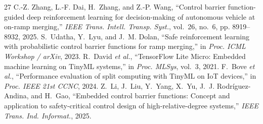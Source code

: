 \documentclass[journal]{IEEEtran}
\begin{document}
\begin{thebibliography}{27}
C.-Z. Zhang, L.-F. Dai, H.~Zhang, and Z.-P. Wang, ``Control barrier function-guided deep reinforcement learning for decision-making of autonomous vehicle at on-ramp merging,'' \textit{IEEE Trans. Intell. Transp. Syst.}, vol.~26, no.~6, pp. 8919--8932, 2025.
S.~Udatha, Y.~Lyu, and J.~M. Dolan, ``Safe reinforcement learning with probabilistic control barrier functions for ramp merging,'' in \textit{Proc. ICML Workshop / arXiv}, 2023.
R.~David \textit{et al.}, ``TensorFlow Lite Micro: Embedded machine learning on TinyML systems,'' in \textit{Proc. MLSys}, vol.~3, 2021.
F.~Bove \textit{et al.}, ``Performance evaluation of split computing with TinyML on IoT devices,'' in \textit{Proc. IEEE 21st CCNC}, 2024.
Z.~Li, J.~Liu, Y.~Yang, X.~Yu, J.~J. Rodr\'iguez-Andina, and H.~Gao, ``Embedded control barrier functions: Concept and application to safety-critical control design of high-relative-degree systems,'' \textit{IEEE Trans. Ind. Informat.}, 2025.
\end{thebibliography}
\end{document}
